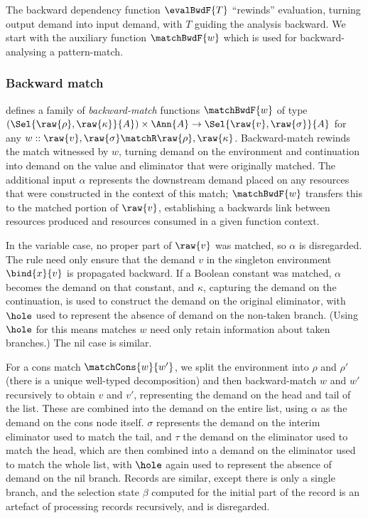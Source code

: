 The backward dependency function $\evalBwdF{T}$ ``rewinds'' evaluation, turning output demand into input demand, with $T$ guiding the analysis backward. We start with the auxiliary function $\matchBwdF{w}$ which is used for backward-analysing a pattern-match.

\subsubsection{Backward match}
\label{sec:data-dependencies:analyses:bwd:pattern-match}

 defines a family of \emph{backward-match} functions $\matchBwdF{w}$ of type $(\Sel{\raw{\rho}, \raw{\kappa}}{A}) \times \Ann{A} \to \Sel{\raw{v}, \raw{\sigma}}{A}$ for any $w :: \raw{v}, \raw{\sigma} \matchR \raw{\rho}, \raw{\kappa}$. Backward-match rewinds the match witnessed by $w$, turning demand on the environment and continuation into demand on the value and eliminator that were originally matched. The additional input $\alpha$ represents the downstream demand placed on any resources that were constructed in the context of this match; $\matchBwdF{w}$ transfers this to the matched portion of $\raw{v}$, establishing a backwards link between resources produced and resources consumed in a given function context.



In the variable case, no proper part of $\raw{v}$ was matched, so $\alpha$ is disregarded. The rule need only ensure that the demand $v$ in the singleton environment $\bind{x}{v}$ is propagated backward. If a Boolean constant was matched, $\alpha$ becomes the demand on that constant, and $\kappa$, capturing the demand on the continuation, is used to construct the demand on the original eliminator, with $\hole$ used to represent the absence of demand on the non-taken branch. (Using $\hole$ for this means matches $w$ need only retain information about taken branches.) The nil case is similar.

For a cons match $\matchCons{w}{w'}$, we split the environment into $\rho$ and $\rho'$ (there is a unique well-typed decomposition) and then backward-match $w$ and $w'$ recursively to obtain $v$ and $v'$, representing the demand on the head and tail of the list. These are combined into the demand on the entire list, using $\alpha$ as the demand on the cons node itself. $\sigma$ represents the demand on the interim eliminator used to match the tail, and $\tau$ the demand on the eliminator used to match the head, which are then combined into a demand on the eliminator used to match the whole list, with $\hole$ again used to represent the absence of demand on the nil branch. Records are similar, except there is only a single branch, and the selection state $\beta$ computed for the initial part of the record is an artefact of processing records recursively, and is disregarded.

